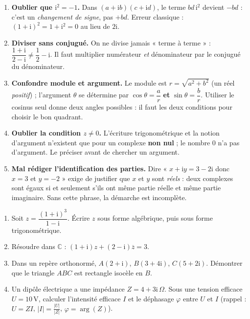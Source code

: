 \documentclass[11pt]{article}
\begin{document}
\begin{attention}
\begin{enumerate}
\item \textbf{Oublier que $\mathrm{i}^2 = -1$.} Dans $(a+\mathrm{i}b)(c+\mathrm{i}d)$, le terme $bd\,\mathrm{i}^2$ devient $-bd$ : c'est un \emph{changement de signe}, pas $+bd$. Erreur classique : $(1+\mathrm{i})^2 = 1 + \mathrm{i}^2 = 0$ au lieu de $2\mathrm{i}$.
\item \textbf{Diviser sans conjugué.} On ne divise jamais « terme à terme » : $\dfrac{1+\mathrm{i}}{2-\mathrm{i}} \neq \dfrac{1}{2} - \mathrm{i}$. Il faut multiplier numérateur \emph{et} dénominateur par le conjugué du dénominateur.
\item \textbf{Confondre module et argument.} Le module est $r = \sqrt{a^2+b^2}$ (un réel \emph{positif}) ; l'argument $\theta$ se détermine par $\cos\theta = \dfrac{a}{r}$ \textbf{et} $\sin\theta = \dfrac{b}{r}$. Utiliser le cosinus seul donne deux angles possibles : il faut les deux conditions pour choisir le bon quadrant.
\item \textbf{Oublier la condition $z \neq 0$.} L'écriture trigonométrique et la notion d'argument n'existent que pour un complexe \textbf{non nul} ; le nombre $0$ n'a pas d'argument. Le préciser avant de chercher un argument.
\item \textbf{Mal rédiger l'identification des parties.} Dire « $x + \mathrm{i}y = 3 - 2\mathrm{i}$ donc $x = 3$ et $y = -2$ » exige de justifier que $x$ et $y$ sont \emph{réels} : deux complexes sont égaux si et seulement s'ils ont même partie réelle et même partie imaginaire. Sans cette phrase, la démarche est incomplète.
\end{enumerate}
\end{attention}

\begin{exercice}
\begin{enumerate}
\item Soit $z = \dfrac{(1+\mathrm{i})^3}{1-\mathrm{i}}$. Écrire $z$ sous forme algébrique, puis sous forme trigonométrique.
\item Résoudre dans $\mathbb{C}$ : $(1+\mathrm{i})z + (2-\mathrm{i})\overline{z} = 3$.
\item Dans un repère orthonormé, $A(2+\mathrm{i})$, $B(3+4\mathrm{i})$, $C(5+2\mathrm{i})$. Démontrer que le triangle $ABC$ est rectangle isocèle en $B$.
\item Un dipôle électrique a une impédance $Z = 4 + 3\mathrm{i}\,\Omega$. Sous une tension efficace $U = 10\,\mathrm{V}$, calculer l'intensité efficace $I$ et le déphasage $\varphi$ entre $U$ et $I$ (rappel : $U = ZI$, $|I| = \frac{|U|}{|Z|}$, $\varphi = \arg(Z)$).
\end{enumerate}
\end{exercice}
\end{document}
